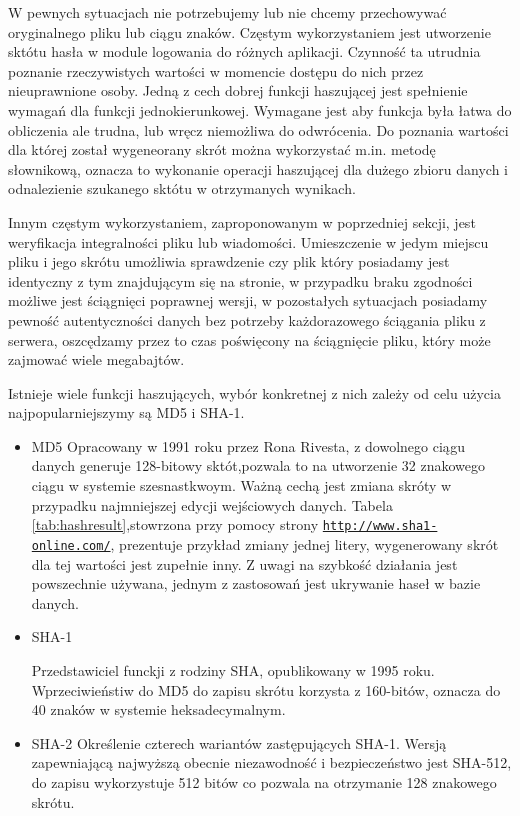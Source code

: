 W pewnych sytuacjach nie potrzebujemy lub nie chcemy przechowywać oryginalnego pliku lub ciągu znaków. Częstym wykorzystaniem jest utworzenie sktótu hasła w module logowania do różnych aplikacji. Czynność ta utrudnia poznanie rzeczywistych wartości w momencie dostępu do nich przez nieuprawnione osoby. Jedną z cech dobrej funkcji haszującej jest
spełnienie wymagań dla funkcji jednokierunkowej. Wymagane jest aby funkcja była łatwa do obliczenia ale trudna, lub wręcz niemożliwa do odwrócenia.
Do poznania wartości dla której został wygeneorany skrót można wykorzystać m.in. metodę słownikową, oznacza to wykonanie operacji haszującej dla dużego zbioru danych i odnalezienie szukanego sktótu w otrzymanych wynikach.

Innym częstym wykorzystaniem, zaproponowanym w poprzedniej sekcji, jest weryfikacja integralności pliku lub wiadomości. Umieszczenie w jedym miejscu pliku i jego skrótu umożliwia sprawdzenie czy plik który posiadamy jest identyczny z tym znajdującym się na stronie, w przypadku braku zgodności możliwe jest ściągnięci poprawnej wersji, w pozostałych sytuacjach posiadamy pewność autentyczności danych bez potrzeby każdorazowego ściągania pliku z serwera, oszcędzamy przez to czas poświęcony na ściągnięcie pliku, który może zajmować wiele megabajtów.

Istnieje wiele funkcji haszujących, wybór konkretnej z nich zależy od celu użycia najpopularniejszymy są MD5 i SHA-1.

\begin{itemize}
\item
MD5
Opracowany w 1991 roku przez Rona Rivesta, z dowolnego ciągu danych generuje 128-bitowy sktót,pozwala to na utworzenie 32 znakowego ciągu w systemie szesnastkwoym. Ważną cechą jest zmiana skróty w przypadku najmniejszej edycji wejściowych danych. Tabela \ref{tab:hashresult},stowrzona przy pomocy strony \underline{\texttt{http://www.sha1-online.com/}}, prezentuje przykład zmiany jednej litery, wygenerowany skrót dla tej wartości jest zupełnie inny.
Z uwagi na szybkość działania jest powszechnie używana, jednym z zastosowań jest ukrywanie haseł w bazie danych.

\item
SHA-1

Przedstawiciel funckji z rodziny SHA, opublikowany w 1995 roku. Wprzeciwieństiw do MD5 do zapisu skrótu korzysta z 160-bitów, oznacza do 40 znaków w systemie heksadecymalnym.

\item
SHA-2
Określenie czterech wariantów zastępujących SHA-1. Wersją zapewniającą najwyższą obecnie niezawodność i bezpieczeństwo jest SHA-512, do zapisu wykorzystuje 512 bitów co pozwala na otrzymanie 128 znakowego skrótu.

\end{itemize}

